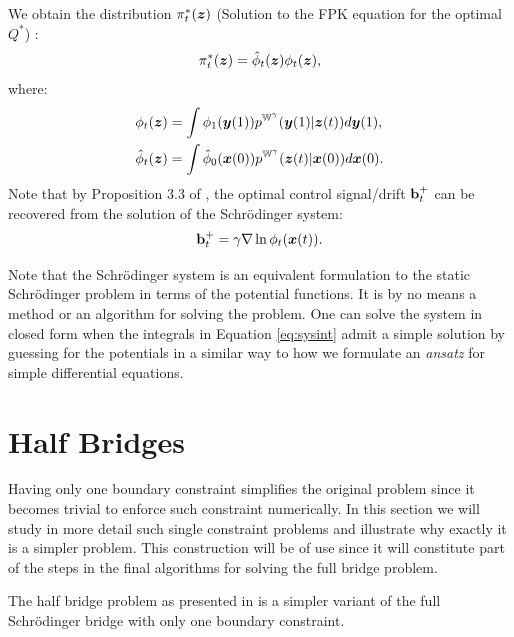 \documentclass[a4paper,12pt,twoside,openright]{report}
\theoremstyle{definition}
\begin{document}
We obtain the distribution $\pi^{*}_t({\bm{z}})$ (Solution to the FPK equation for the optimal $Q^{*}$) :
\begin{align}
    \pi^{*}_t({\bm{z}}) =  {\hat{\phi}}_t({\bm{z}}) \phi_t({\bm{z}}) ,
\end{align}
where:
\begin{align}
    \phi_t({\bm{z}}) &= \int \phi_1({\bm{y}}(1) ) p^{\mathbb{W}^{\gamma}}({\bm{y}}(1)|{\bm{z}}(t)) d{\bm{y}}(1), \nonumber\\ 
    {\hat{\phi}}_t({\bm{z}}) &= \int {\hat{\phi}}_0({\bm{x}}(0)) p^{\mathbb{W}^{\gamma}}({\bm{z}}(t)|{\bm{x}}(0)) d{\bm{x}}(0). \nonumber
\end{align}
Note that by Proposition 3.3 of \cite{pavon1991free}, the optimal control signal/drift ${\mathbf{b}}_t^+$ can be recovered from the solution of the Schrödinger system:
\begin{align} \label{eq:drifr_potential}
    {\mathbf{b}}_t^{+} = \gamma \nabla \ln \phi_t({\bm{x}}(t) ).
\end{align}

Note that the Schrödinger system is an equivalent formulation to the static Schrödinger problem in terms of the potential functions. It is by no means a method or an algorithm for solving the problem. One can solve the system in closed form when the integrals in Equation \ref{eq:sysint} admit a simple solution by guessing for the potentials in a similar way to how we formulate an \textit{ansatz} for simple differential equations. 

\section{Half Bridges}

Having only one boundary constraint simplifies the original problem since it becomes trivial to enforce such constraint numerically. In this section we will study in more detail such single constraint problems and illustrate why exactly it is a simpler problem. This construction will be of use since it will constitute part of the steps in the final algorithms for solving the full bridge problem.

The half bridge problem as presented in \cite{pavon2018data} is a simpler variant of the full Schrödinger bridge with only one boundary constraint. 
\end{document}
